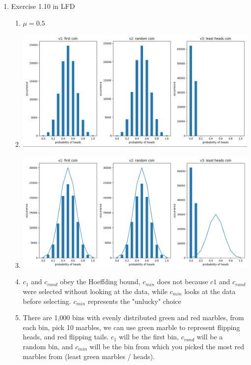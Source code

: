 \documentclass{article}
\begin{document}
\begin{enumerate}
        \item Exercise 1.10 in LFD
        \begin{enumerate}[label=(\alph*)]
            \item $\mu = 0.5$
            \item \includegraphics[scale=0.35]{images/1.10b.png}
            \item \includegraphics[scale=0.35]{images/1.10c.png}
            \item $c_1$ and $c_{rand}$ obey the Hoeffding bound, $c_{min}$ does not because $c1$ and $c_{rand}$ were selected without looking at the data, while $c_{min}$ looks at the data before selecting. $c_{min}$ represents the "unlucky" choice
            \item There are 1,000 bins with evenly distributed green and red marbles, from each bin, pick 10 marbles, we can use green marble to represent flipping heads, and red flipping tails. $c_1$ will be the first bin, $c_{rand}$ will be a random bin, and $c_{min}$ will be the bin from which you picked the most red marbles from (least green marbles / heads).
        \end{enumerate}


\end{enumerate}
\end{document}
